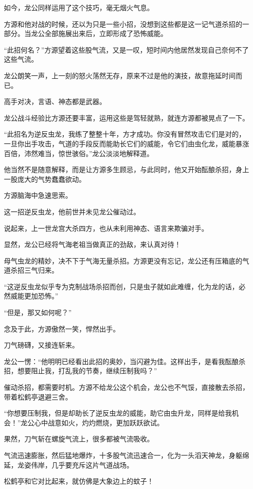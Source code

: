 \begin{this_body}
如今，龙公同样运用了这个技巧，毫无烟火气息。

方源和他对战的时候，还以为只是一些小招，没想到这些都是这一记气道杀招的一部分。当龙公全部施展出来后，立即形成了恐怖威能。

“此招何名？”方源望着这些股气流，又是一叹，短时间内他居然发现自己奈何不了这些气流。

龙公朗笑一声，上一刻的怒火荡然无存，原来不过是他的演技，故意拖延时间而已。

高手对决，言语、神态都是武器。

龙公战斗经验比方源还要丰富，运用这些是驾轻就熟，就连方源都被晃点了一下。

“此招名为逆反虫龙，我练了整整十年，方才成功。你没有冒然攻击它们是对的，一旦你出手攻击，气道的手段反而能助长它们的威能，令它们由虫化龙，威能暴涨百倍，沛然难当，惊世骇俗。”龙公淡淡地解释道。

他当然不是随意解释，而是让方源多生顾忌，与此同时，他又开始酝酿杀招，身上一股庞大的气势蠢蠢欲动。

方源脑海中急速思索。

这一招逆反虫龙，他前世并未见龙公催动过。

说起来，上一世龙宫大杀四方，也从未利用神态、语言来欺骗对手。

显然，龙公已经将气海老祖当做真正的劲敌，来认真对待！

母气虫龙的精妙，决不下于气海无量杀招。方源更没有忘记，龙公还有压箱底的气道杀招三气归来。

“这逆反虫龙似乎专为克制战场杀招而创，只是虫子就如此难缠，化为龙的话，必然威能更加恐怖。”

“但是，那又如何呢？”

念及于此，方源傲然一笑，悍然出手。

刀气磅礴，又接连斩来。

龙公一愣：“他明明已经看出此招的奥妙，当闪避为佳。这样出手，是看我酝酿杀招，想要阻止我，打乱我的节奏，继续压制我吗？”

催动杀招，都需要时机。方源不给龙公这个机会，龙公也不气馁，直接散去杀招，带着松鹤亭退避三舍。

“你想要压制我，但是却助长了逆反虫龙的威能，助它由虫升龙，同样是给我机会！”龙公心中战意如火，灼灼燃烧，更加跃跃欲试。

果然，刀气斩在螺旋气流上，很多都被气流吸收。

气流迅速膨胀，然后猛地爆炸，十多股气流迅速合一，化为一头滔天神龙，身躯绵延，龙姿伟岸，几乎要充斥这片气道战场。

松鹤亭和它对比起来，就仿佛是大象边上的蚊子！


\end{this_body}
